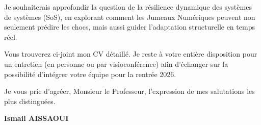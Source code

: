 \documentclass[a4paper,12pt]{article}
\begin{document}
Je souhaiterais approfondir la question de la résilience dynamique des systèmes de systèmes (SoS), en explorant comment les Jumeaux Numériques peuvent non seulement prédire les chocs, mais aussi guider l'adaptation structurelle en temps réel.

Vous trouverez ci-joint mon CV détaillé. Je reste à votre entière disposition pour un entretien (en personne ou par visioconférence) afin d'échanger sur la possibilité d'intégrer votre équipe pour la rentrée 2026.

Je vous prie d'agréer, Monsieur le Professeur, l'expression de mes salutations les plus distinguées.

\bigskip

\begin{flushright}
    \textbf{Ismail AISSAOUI}
\end{flushright}
\end{document}

